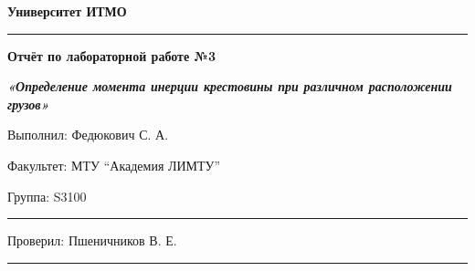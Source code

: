 \documentclass[12pt]{article}
\begin{document}
\pagestyle{empty}
\begin{center}
\large{\textbf{Университет ИТМО}}
\end{center}
\rule{500pt}{1pt}
\par\bigskip\par\bigskip\par\bigskip\par\bigskip\par\bigskip\par\bigskip\par\bigskip\par\bigskip
\begin{center}
\Large
\textbf{Отчёт по лабораторной работе №3}

\textbf{\textit{«Определение момента инерции крестовины при различном расположении грузов»}}


\end{center}
\par\bigskip\par\bigskip\par\bigskip\par\bigskip\par\bigskip\par\bigskip\par\bigskip\par\bigskip\par\bigskip\par\bigskip\par\bigskip\par\bigskip\par\bigskip\par\bigskip      
\begin{flushright}
\large
Выполнил: Федюкович С. А.
\par\bigskip
Факультет: МТУ “Академия ЛИМТУ”
\par\bigskip
Группа: S3100                       
\par\bigskip\par\bigskip\par\bigskip

\rule{150pt}{0.5pt}
\par\bigskip\par\bigskip\par\bigskip\par\bigskip                                                            
 Проверил: Пшеничников В. Е. 
\par\bigskip \par\bigskip

\rule{150pt}{0.5pt}
\end{flushright}
\end{document}

